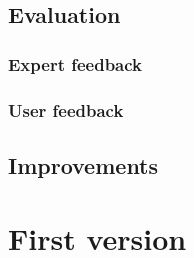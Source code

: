 \documentclass[11pt]{report}
\begin{document}
\section{Evaluation}
\subsection{Expert feedback}
\subsection{User feedback}
\section{Improvements}

\chapter{First version}
\end{document}
